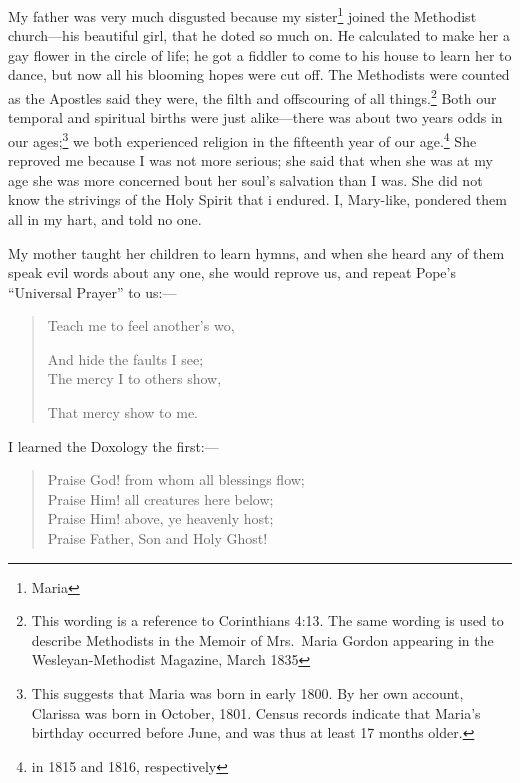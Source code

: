 My father was very much disgusted because my sister\footnote{Maria} joined the Methodist church---his beautiful girl, that he doted so much on.
He calculated to make her a gay flower in the circle of life; he got a fiddler to come to his house to learn her to dance, but now all his blooming hopes were cut off.
The Methodists were counted as the Apostles said they were, the filth and offscouring of all things.\footnote{This wording is a reference to Corinthians 4:13. The same wording is used to describe Methodists in the Memoir of Mrs.\ Maria Gordon appearing in the Wesleyan-Methodist Magazine, March 1835}
Both our temporal and spiritual births were just alike---there was about two years odds in our ages;\footnote{This suggests that Maria was born in early 1800. By her own account, Clarissa was born in October, 1801. Census records indicate that Maria's birthday occurred before June, and was thus at least 17 months older.} we both experienced religion in the fifteenth year of our age.\footnote{in 1815 and 1816, respectively}
She reproved me because I was not more serious; she said that when she was at my age she was more concerned bout her soul's salvation than I was.
She did not know the strivings of the Holy Spirit that i endured.
I, Mary-like, pondered them all in my hart, and told no one.

My mother taught her children to learn hymns, and when she heard any of them speak evil words about any one, she would reprove us, and repeat Pope's ``Universal Prayer'' to us:---
\begin{quote}
\setlength{\parindent}{2ex}
    Teach me to feel another's wo,
    \setlength{\parskip}{0pt}
    \par And hide the faults I see;\\
    The mercy I to others show,
    \par That mercy show to me.
\end{quote}

I learned the Doxology the first:---
\begin{quote}
    Praise God! from whom all blessings flow;\\
    Praise Him! all creatures here below;\\
    Praise Him! above, ye heavenly host;\\
    Praise Father, Son and Holy Ghost!
\end{quote}


